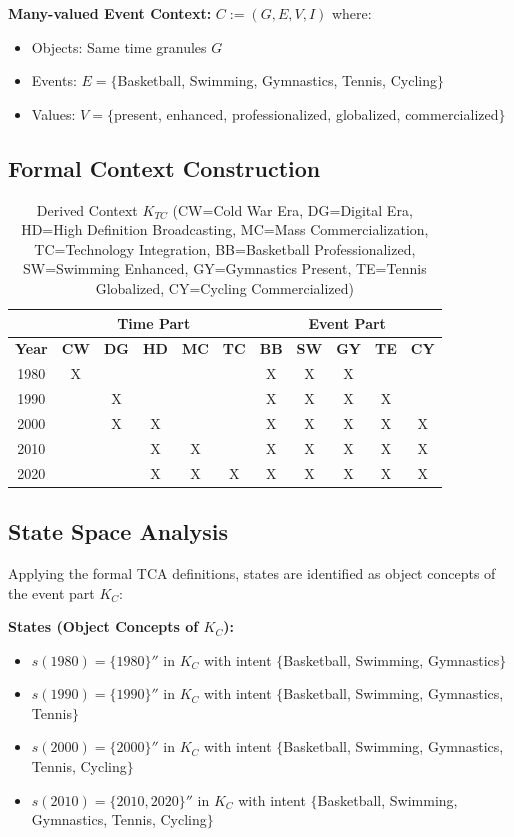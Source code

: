 \documentclass{article}
\begin{document}
\textbf{Many-valued Event Context:} $C := (G, E, V, I)$ where:
\begin{itemize}
    \item Objects: Same time granules $G$
    \item Events: $E = \{$Basketball, Swimming, Gymnastics, Tennis, Cycling$\}$
    \item Values: $V = \{$present, enhanced, professionalized, globalized, commercialized$\}$
\end{itemize}

\subsection*{Formal Context Construction}

\begin{table}[h]
\centering
\begin{tabular}{|c|c|c|c|c|c|c|c|c|c|c|}
\hline
 & \multicolumn{5}{c|}{\textbf{Time Part}} & \multicolumn{5}{c|}{\textbf{Event Part}} \\
\hline
\textbf{Year} & \textbf{CW} & \textbf{DG} & \textbf{HD} & \textbf{MC} & \textbf{TC} & \textbf{BB} & \textbf{SW} & \textbf{GY} & \textbf{TE} & \textbf{CY} \\
\hline
1980 & X & & & & & X & X & X & & \\
\hline
1990 & & X & & & & X & X & X & X & \\
\hline
2000 & & X & X & & & X & X & X & X & X \\
\hline
2010 & & & X & X & & X & X & X & X & X \\
\hline
2020 & & & X & X & X & X & X & X & X & X \\
\hline
\end{tabular}
\caption{Derived Context $K_{TC}$ (CW=Cold War Era, DG=Digital Era, HD=High Definition Broadcasting, MC=Mass Commercialization, TC=Technology Integration, BB=Basketball Professionalized, SW=Swimming Enhanced, GY=Gymnastics Present, TE=Tennis Globalized, CY=Cycling Commercialized)}
\end{table}

\subsection*{State Space Analysis}

Applying the formal TCA definitions, states are identified as object concepts of the event part $K_C$:

\textbf{States (Object Concepts of $K_C$):}
\begin{itemize}
    \item $s(1980) = \{1980\}''$ in $K_C$ with intent $\{$Basketball, Swimming, Gymnastics$\}$
    \item $s(1990) = \{1990\}''$ in $K_C$ with intent $\{$Basketball, Swimming, Gymnastics, Tennis$\}$  
    \item $s(2000) = \{2000\}''$ in $K_C$ with intent $\{$Basketball, Swimming, Gymnastics, Tennis, Cycling$\}$
    \item $s(2010) = \{2010, 2020\}''$ in $K_C$ with intent $\{$Basketball, Swimming, Gymnastics, Tennis, Cycling$\}$
\end{itemize}
\end{document}
